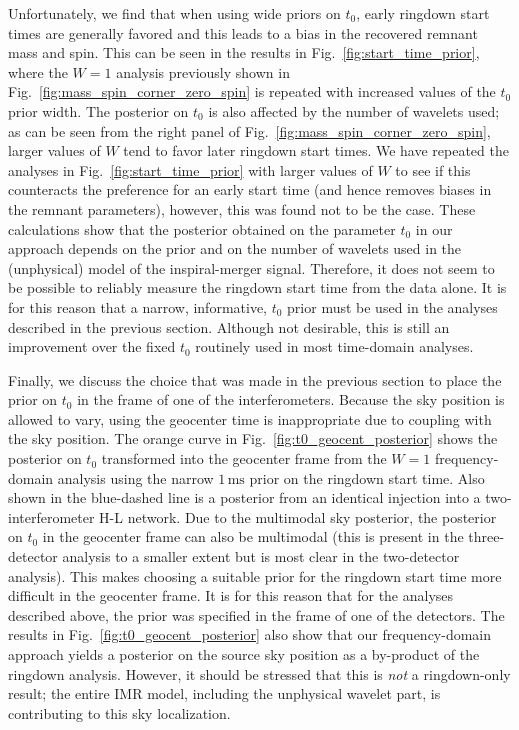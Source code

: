 Unfortunately, we find that when using wide priors on $t_0$, early ringdown start times are generally favored and this leads to a bias in the recovered remnant mass and spin.
This can be seen in the results in Fig.~\ref{fig:start_time_prior}, where the $W=1$ analysis previously shown in Fig.~\ref{fig:mass_spin_corner_zero_spin} is repeated with increased values of the $t_0$ prior width.
The posterior on $t_0$ is also affected by the number of wavelets used;
as can be seen from the right panel of Fig.~\ref{fig:mass_spin_corner_zero_spin}, larger values of $W$ tend to favor later ringdown start times. 
We have repeated the analyses in Fig.~\ref{fig:start_time_prior} with larger values of $W$ to see if this counteracts the preference for an early start time (and hence removes biases in the remnant parameters), however, this was found not to be the case.
These calculations show that the posterior obtained on the parameter $t_0$ in our approach depends on the prior and on the number of wavelets used in the (unphysical) model of the inspiral-merger signal.
Therefore, it does not seem to be possible to reliably measure the ringdown start time from the data alone.
It is for this reason that a narrow, informative, $t_0$ prior must be used in the analyses described in the previous section.
Although not desirable, this is still an improvement over the fixed $t_0$ routinely used in most time-domain analyses.

Finally, we discuss the choice that was made in the previous section to place the prior on $t_0$ in the frame of one of the interferometers.
Because the sky position is allowed to vary, using the geocenter time is inappropriate due to coupling with the sky position.
The orange curve in Fig.~\ref{fig:t0_geocent_posterior} shows the posterior on $t_0$ transformed into the geocenter frame from the $W=1$ frequency-domain analysis using the narrow $1\,\mathrm{ms}$ prior on the ringdown start time. 
Also shown in the blue-dashed line is a posterior from an identical injection into a two-interferometer H-L network.
Due to the multimodal sky posterior, the posterior on $t_0$ in the geocenter frame can also be multimodal (this is present in the three-detector analysis to a smaller extent but is most clear in the two-detector analysis).
This makes choosing a suitable prior for the ringdown start time more difficult in the geocenter frame.
It is for this reason that for the analyses described above, the prior was specified in the frame of one of the detectors.
The results in Fig.~\ref{fig:t0_geocent_posterior} also show that our frequency-domain approach yields a posterior on the source sky position as a by-product of the ringdown analysis. However, it should be stressed that this is \emph{not} a ringdown-only result; the entire IMR model, including the unphysical wavelet part, is contributing to this sky localization.


